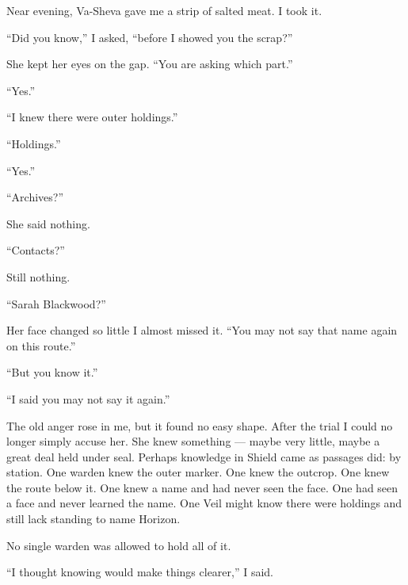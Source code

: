 Near evening, Va-Sheva gave me a strip of salted meat. I took it.\par

``Did you know,'' I asked, ``before I showed you the scrap?''\par

She kept her eyes on the gap. ``You are asking which part.''\par

``Yes.''\par

``I knew there were outer holdings.''\par

``Holdings.''\par

``Yes.''\par

``Archives?''\par

She said nothing.\par

``Contacts?''\par

Still nothing.\par

``Sarah Blackwood?''\par

Her face changed so little I almost missed it. ``You may not say that name again on this route.''\par

``But you know it.''\par

``I said you may not say it again.''\par

The old anger rose in me, but it found no easy shape. After the trial I could no longer simply accuse her. She knew something --- maybe very little, maybe a great deal held under seal. Perhaps knowledge in Shield came as passages did: by station. One warden knew the outer marker. One knew the outcrop. One knew the route below it. One knew a name and had never seen the face. One had seen a face and never learned the name. One Veil might know there were holdings and still lack standing to name Horizon.\par

No single warden was allowed to hold all of it.\par

``I thought knowing would make things clearer,'' I said.\par

